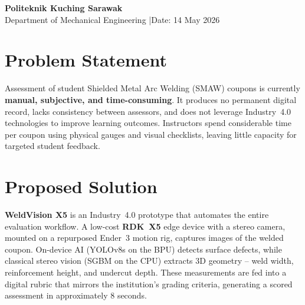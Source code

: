\documentclass[11pt,a4paper]{article}
\begin{document}

\begin{center}

  \vspace{6pt}
  {\normalsize\bfseries\color{darkblue} Politeknik Kuching Sarawak}\\[2pt]
  {\small Department of Mechanical Engineering \quad|\quad Date: 14 May 2026}
\end{center}

\vspace{8pt}

\section{Problem Statement}

Assessment of student Shielded Metal Arc Welding (SMAW) coupons is currently \textbf{manual, subjective, and
time-consuming}. It produces no permanent digital record, lacks consistency between assessors, and does not
leverage Industry~4.0 technologies to improve learning outcomes. Instructors spend considerable time per
coupon using physical gauges and visual checklists, leaving little capacity for targeted student feedback.

\section{Proposed Solution}

\textbf{WeldVision X5} is an Industry~4.0 prototype that automates the entire evaluation workflow. A
low-cost \textbf{RDK~X5} edge device with a stereo camera, mounted on a repurposed Ender~3 motion rig,
captures images of the welded coupon. On-device AI (YOLOv8s on the BPU) detects surface defects, while
classical stereo vision (SGBM on the CPU) extracts 3D geometry -- weld width, reinforcement height, and
undercut depth. These measurements are fed into a digital rubric that mirrors the institution's grading
criteria, generating a scored assessment in approximately 8 seconds.
\end{document}
